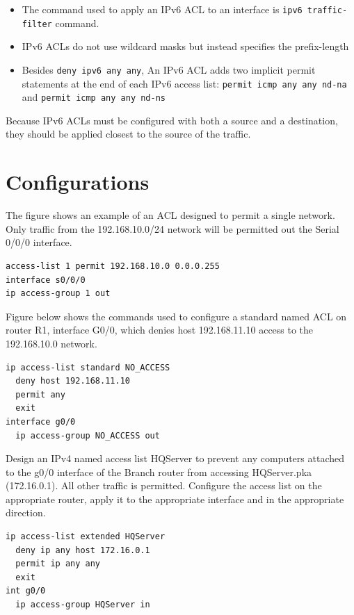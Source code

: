 \begin{itemize}
\item The command used to apply an IPv6 ACL to an interface is \texttt{ipv6 traffic-filter} command.
\item IPv6 ACLs do not use wildcard masks but instead specifies the prefix-length
\item Besides \texttt{deny ipv6 any any}, An IPv6 ACL adds two implicit permit statements at the end of each IPv6 access list: \texttt{permit icmp any any nd-na} and \texttt{permit icmp any any nd-ns}
\end{itemize}
	
Because IPv6 ACLs must be configured with both a source and a destination, they should be applied closest to the source of the traffic.

\section{Configurations}

\begin{example}
The figure shows an example of an ACL designed to permit a single network. Only traffic from the 192.168.10.0/24 network will be permitted out the Serial 0/0/0 interface.
\begin{verbatim}
access-list 1 permit 192.168.10.0 0.0.0.255
interface s0/0/0
ip access-group 1 out
\end{verbatim}
\end{example}

\begin{example}
Figure below shows the commands used to configure a standard named ACL on router R1, interface G0/0, which denies host 192.168.11.10 access to the 192.168.10.0 network.
\begin{verbatim}
ip access-list standard NO_ACCESS
  deny host 192.168.11.10
  permit any
  exit
interface g0/0
  ip access-group NO_ACCESS out
\end{verbatim}
\end{example}

\begin{example}
Design an IPv4 named access list HQServer to prevent any computers attached to the g0/0 interface of the Branch router from accessing HQServer.pka (172.16.0.1). All other traffic is permitted. Configure the access list on the appropriate router, apply it to the appropriate interface and in the appropriate direction.
\begin{verbatim}
ip access-list extended HQServer
  deny ip any host 172.16.0.1
  permit ip any any
  exit
int g0/0
  ip access-group HQServer in
\end{verbatim}
\end{example}

